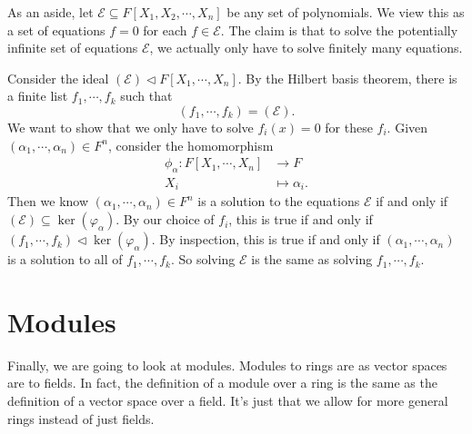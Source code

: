 \documentclass[a4paper]{article}
\begin{document}
As an aside, let $\mathcal{E} \subseteq F[X_1, X_2, \cdots, X_n]$ be any set of polynomials. We view this as a set of equations $f = 0$ for each $f \in \mathcal{E}$. The claim is that to solve the potentially infinite set of equations $\mathcal{E}$, we actually only have to solve finitely many equations.

Consider the ideal $(\mathcal{E}) \lhd F[X_1, \cdots, X_n]$. By the Hilbert basis theorem, there is a finite list $f_1, \cdots, f_k$ such that
\[
  (f_1, \cdots, f_k) = (\mathcal{E}).
\]
We want to show that we only have to solve $f_i(x) = 0$ for these $f_i$. Given $(\alpha_1, \cdots, \alpha_n) \in F^n$, consider the homomorphism
\begin{align*}
  \phi_\alpha: F[X_1, \cdots, X_n] &\to F\\
  X_i &\mapsto \alpha_i.
\end{align*}
Then we know $(\alpha_1, \cdots, \alpha_n) \in F^n$ is a solution to the equations $\mathcal{E}$ if and only if $(\mathcal{E}) \subseteq \ker(\varphi_\alpha)$. By our choice of $f_i$, this is true if and only if $(f_1, \cdots, f_k) \lhd \ker(\varphi_\alpha)$. By inspection, this is true if and only if $(\alpha_1, \cdots, \alpha_n)$ is a solution to all of $f_1, \cdots, f_k$. So solving $\mathcal{E}$ is the same as solving $f_1, \cdots, f_k$.

\section{Modules}
Finally, we are going to look at modules. Modules to rings are as vector spaces are to fields. In fact, the definition of a module over a ring is the same as the definition of a vector space over a field. It's just that we allow for more general rings instead of just fields.
\end{document}
